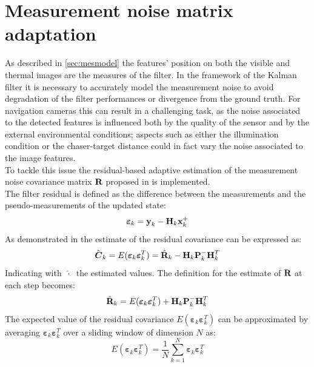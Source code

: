\section{Measurement noise matrix adaptation}
As described in \cref{sec:mesmodel} the features' position on both the visible and thermal images are the measures of the filter. In the framework of the Kalman filter it is necessary to accurately model the measurement noise to avoid degradation of the filter performances or divergence from the ground truth. For navigation cameras this can result in a challenging task, as the noise associated to the detected features is influenced both by the quality of the sensor and by the external environmental conditions; aspects such as either the illumination condition or the chaser-target distance could in fact vary the noise associated to the image features.\\
To tackle this issue the residual-based adaptive estimation of the measurement noise covariance matrix $\mathrm{\textbf{R}}$ proposed in \cite{akhlaghi2017adaptive} is implemented.\\
The filter residual is defined as the difference between the measurements and the pseudo-measurements of the updated state:
\begin{equation}
    \boldsymbol{\varepsilon}_k = \mathrm{\textbf{y}}_k - \mathrm{\textbf{H}}_k \mathrm{\textbf{x}}_k^+
\end{equation}
As demonstrated in \cite{akhlaghi2017adaptive} the estimate of the residual covariance can be expressed as:
\begin{equation}
    \hat{\boldsymbol{C}}_k = E(\boldsymbol{\varepsilon}_k \boldsymbol{\varepsilon}_k^T) = \hat{\mathrm{\textbf{R}}}_k - \mathrm{\textbf{H}}_k \mathrm{\textbf{P}}_k^- \mathrm{\textbf{H}}_k^T
\end{equation}
Indicating with $\ \hat{\cdot} \ $ the estimated values. The definition for the estimate of $\mathrm{\textbf{R}}$ at each step becomes:
\begin{equation}
\label{eq:R_est}
    \hat{\mathrm{\textbf{R}}}_k = E(\boldsymbol{\varepsilon}_k \boldsymbol{\varepsilon}_k^T) + \mathrm{\textbf{H}}_k \mathrm{\textbf{P}}_k^- \mathrm{\textbf{H}}_k^T
\end{equation}
The expected value of the residual covariance $E(\boldsymbol{\varepsilon}_k \boldsymbol{\varepsilon}_k^T)$ can be approximated by averaging $\boldsymbol{\varepsilon}_k \boldsymbol{\varepsilon}_k^T$ over a sliding window of dimension $N$ as:
\begin{equation}
    E(\boldsymbol{\varepsilon}_k \boldsymbol{\varepsilon}_k^T) = \dfrac{1}{N} \sum_{k=1}^N \boldsymbol{\varepsilon}_k \boldsymbol{\varepsilon}_k^T
\end{equation}

